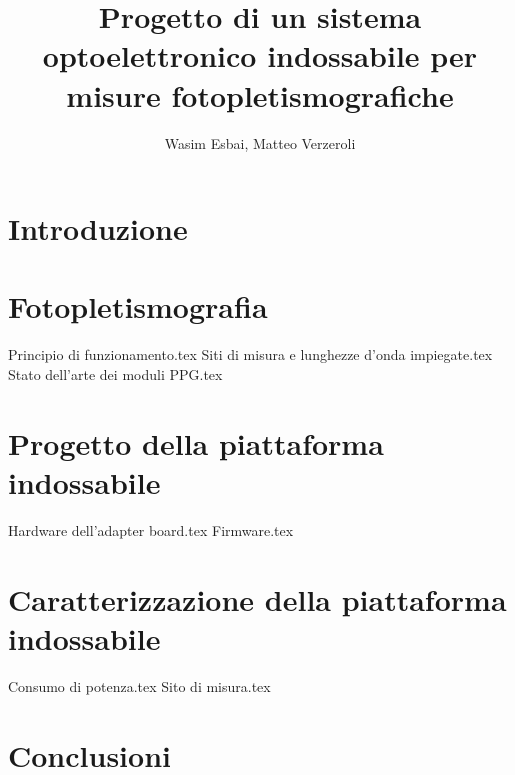 \documentclass[12pt,a4paper]{book}
\title{Progetto di un sistema optoelettronico indossabile per misure fotopletismografiche}
\author{Wasim Esbai, Matteo Verzeroli}
\begin{document}
	\maketitle
	
	\tableofcontents
	
	\chapter*{Introduzione}
	
	\chapter{Fotopletismografia}
	{Principio di funzionamento.tex}
	{Siti di misura e lunghezze d’onda impiegate.tex}
	{Stato dell’arte dei moduli PPG.tex}
	
	\chapter{Progetto della piattaforma indossabile}
	{Hardware dell’adapter board.tex}
	{Firmware.tex}
	
	\chapter{Caratterizzazione della piattaforma indossabile}
	{Consumo di potenza.tex}
	{Sito di misura.tex}
	
	\chapter*{Conclusioni}
	
	
	

	
	
\end{document}
